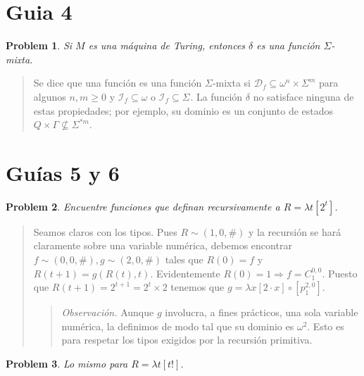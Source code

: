\documentclass[a4paper, 12pt]{article}
\newtheorem{problem}{Problem}
\newtheorem{problem}{Problem}
\begin{document}
\section{Guia 4}

\begin{problem}
Si $M$ es una máquina de Turing, entonces $\delta$ es una función $\Sigma$-mixta.
\end{problem}

\small
\begin{quote}

Se dice que una función es una función $\Sigma$-mixta si $\mathcal{D}_f \subseteq
\omega^n \times \Sigma^{m}$ para algunos $n, m \geq 0$ y $\mathcal{I}_f \subseteq
\omega$ o $\mathcal{I}_f \subseteq \Sigma^{}$. La función $\delta$ no satisface
ninguna de estas propiedades; por ejemplo, su dominio es un conjunto de estados
$Q \times \Gamma \not\subseteq \Sigma^{*m}$.
\end{quote}
\normalsize



\section{Guías 5 y 6}

\begin{problem}
    Encuentre funciones que definan recursivamente a $R = \lambda t \left[  2^t
    \right]$.
\end{problem}


\small
\begin{quote}

Seamos claros con los tipos. Pues $R \sim (1, 0, \#)$ y la recursión se hará
claramente sobre una variable numérica, debemos encontrar $f \sim (0, 0, \#), g
\sim (2, 0, \#)$ tales que $R(0) = f$ y $R(t + 1) = g\left( R(t), t \right) $.
Evidentemente $R(0) = 1 \Rightarrow f = C_1^{0, 0}$. Puesto que $R(t + 1) = 2^{t
+ 1} = 2^t \times 2$ tenemos que $g = \lambda x \left[  2\cdot x \right] \circ
\left[ p_1^{2, 0} \right] $. 

\begin{quote}
    \textit{Observación.} Aunque $g$ involucra, a fines prácticos, una sola variable
    numérica, la definimos de modo tal que su dominio es $\omega^2$. Esto es
    para respetar los tipos exigidos por la recursión primitiva.
\end{quote}

\end{quote}
\normalsize

\begin{problem}
    Lo mismo para $R = \lambda t \left[ t!  \right]$.
\end{problem}
   
\end{document}
